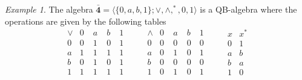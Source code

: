 \documentclass[12pt]{amsart}
\theoremstyle{definition}
\theoremstyle{remark}
\newtheorem{example}{Example}[section]
\numberwithin{equation}{section}
\begin{document}
\begin{example}\label{Example 4-}\cite{QB}
The algebra $\bar{\mathbf{4}} = \langle \{0,a,b,1\} ; \vee ,\wedge ,^\ast, 0, 1 \rangle$ is a QB-algebra where the operations are given by the following tables\\
$$
\begin{array}{c|cccc} \vee & 0\; & a\; & b\; & 1  \\ \hline 0 & 0 & 1 & 0 & 1 \\ a & 1 & 1 & 1 & 1 \\ b& 0 & 1 & 0& 1 \\ 1 & 1 & 1 & 1 & 1 \end{array}\qquad
\begin{array}{c|cccc} \wedge & 0\; & a\; & b\; & 1  \\ \hline 0 & 0 & 0 & 0 & 0 \\ a & 0 & 1 & 0 & 1 \\ b& 0 & 0 & 0 & 0 \\ 1 & 0 & 1 & 0 & 1 \end{array}\qquad
\begin{array}{c|cccc} x & x^{*}   \\ \hline 0 & 1 \\ a & b \\ b& a \\ 1 & 0 \end{array}
$$
\end{example}
\end{document}
